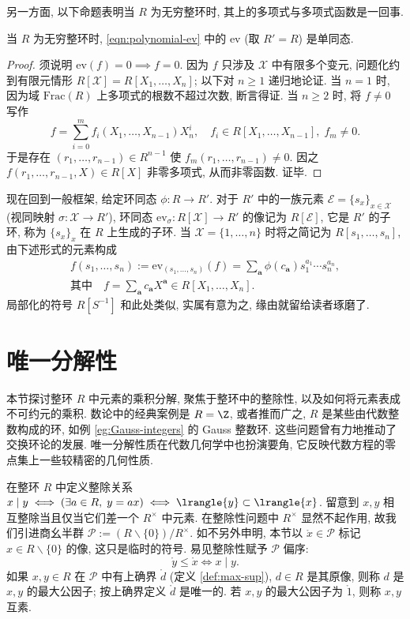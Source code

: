 另一方面, 以下命题表明当 $R$ 为无穷整环时, 其上的多项式与多项式函数是一回事.

\begin{proposition}\label{prop:polynomial-function}
	当 $R$ 为无穷整环时, \eqref{eqn:polynomial-ev} 中的 $\mathrm{ev}$ (取 $R'=R$) 是单同态.
\end{proposition}
\begin{proof}
	须说明 $\text{ev}(f)=0 \implies f=0$. 因为 $f$ 只涉及 $\mathcal{X}$ 中有限多个变元, 问题化约到有限元情形 $R[\mathcal{X}] = R[X_1, \ldots, X_n]$; 以下对 $n \geq 1$ 递归地论证. 当 $n=1$ 时, 因为域 $\text{Frac}(R)$ 上多项式的根数不超过次数, 断言得证. 当 $n \geq 2$ 时, 将 $f \neq 0$ 写作
	\[ f = \sum_{i=0}^m f_i(X_1, \ldots, X_{n-1}) X_n^i, \quad f_i \in R[X_1, \ldots, X_{n-1}], \; f_m \neq 0. \]
	于是存在 $(r_1, \ldots, r_{n-1}) \in R^{n-1}$ 使 $f_m(r_1, \ldots, r_{n-1}) \neq 0$. 因之 $f(r_1, \ldots, r_{n-1}, X) \in R[X]$ 非零多项式, 从而非零函数. 证毕.
\end{proof}

\begin{remark}
	现在回到一般框架, 给定环同态 $\phi: R \to R'$. 对于 $R'$ 中的一族元素 $\mathcal{E} = \{s_x\}_{x \in \mathcal{X}}$ (视同映射 $\sigma: \mathcal{X} \to R'$), 环同态 $\text{ev}_\sigma: R[\mathcal{X}] \to R'$ 的像记为 $R[\mathcal{E}]$, 它是 $R'$ 的子环, 称为 $\{s_x\}_x$ 在 $R$ 上生成的子环. 当 $\mathcal{X}=\{1, \ldots, n\}$ 时将之简记为 $R[s_1, \ldots, s_n]$, 由下述形式的元素构成
	\begin{gather*}
		f(s_1, \ldots, s_n) := \text{ev}_{(s_1, \ldots, s_n)}(f) = \sum_{\bm{a}} \phi(c_{\bm{a}}) s_1^{a_1} \cdots s_n^{a_n}, \\
		\text{其中} \quad f = \sum_{\bm{a}} c_{\bm{a}} X^{\bm{a}} \in R[X_1, \ldots, X_n].
	\end{gather*}
	局部化的符号 $R[S^{-1}]$ 和此处类似, 实属有意为之, 缘由就留给读者琢磨了.
\end{remark}

\section{唯一分解性}\label{sec:UFD}
本节探讨整环 $R$ 中元素的乘积分解, 聚焦于整环中的整除性, 以及如何将元素表成不可约元的乘积. 数论中的经典案例是 $R = \Z$, 或者推而广之, $R$ 是某些由代数整数构成的环, 如例 \ref{eg:Gauss-integers} 的 Gauss 整数环. 这些问题曾有力地推动了交换环论的发展. 唯一分解性质在代数几何学中也扮演要角, 它反映代数方程的零点集上一些较精密的几何性质.

在整环 $R$ 中定义整除关系 $x \mid y \iff (\exists a \in R, \; y=ax) \iff \lrangle{y} \subset \lrangle{x}$. 留意到 $x,y$ 相互整除当且仅当它们差一个 $R^\times$ 中元素. 在整除性问题中 $R^\times$ 显然不起作用, 故我们引进商幺半群 $\mathcal{P} := (R \smallsetminus \{0\})/R^\times$. 如不另外申明, 本节以 $\mathring{x} \in \mathcal{P}$ 标记 $x \in R \smallsetminus \{0\}$ 的像, 这只是临时的符号. 易见整除性赋予 $\mathcal{P}$ 偏序:
\[ \mathring{y} \leq \mathring{x} \iff x \mid y. \]
如果 $x, y \in R$ 在 $\mathcal{P}$ 中有上确界 $\mathring{d}$ (定义 \ref{def:max-sup}), $d \in R$ 是其原像, 则称 $d$ 是 $x,y$ 的最大公因子; 按上确界定义 $\mathring{d}$ 是唯一的. 若 $x,y$ 的最大公因子为 $\mathring{1}$, 则称 $x,y$ 互素.


